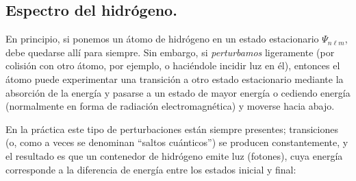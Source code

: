 \subsection{Espectro del hidrógeno.}

En principio, si ponemos un átomo de hidrógeno en un estado estacionario $\Psi_{n \ell m}$, debe quedarse allí para siempre. Sin embargo, si \emph{perturbamos} ligeramente (por colisión con otro átomo, por ejemplo, o haciéndole incidir  luz en él), entonces el átomo puede experimentar una transición a otro estado estacionario mediante la absorción de la energía y pasarse a un estado de mayor energía o cediendo energía (normalmente en forma de radiación electromagnética) y moverse  hacia abajo.
\par
En la práctica este tipo de perturbaciones están siempre presentes; transiciones (o, como a veces se denominan \enquote{saltos cuánticos}) se producen constantemente, y el resultado es que un contenedor de hidrógeno emite luz (fotones), cuya energía corresponde a la diferencia de energía entre los estados inicial y final:
